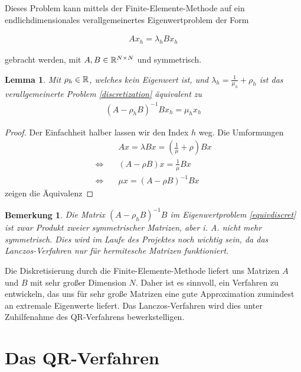 \documentclass{article}
\theoremstyle{plain}
\newtheorem{lemma}      [theorem]{Lemma}
\newtheorem{remark}     [theorem]{Bemerkung}
\begin{document}
Dieses Problem kann mittels der Finite-Elemente-Methode auf ein endlichdimensionales verallgemeinertes Eigenwertproblem der Form

\begin{align} \label{discretization}
	A x_h = \lambda_h B x_h
\end{align}

gebracht werden, mit $A, B \in \mathbb{R}^{N \times N}$ und symmetrisch.

\begin{lemma}\label{lemma_1_3}
	Mit $\rho_h \in \mathbb{R}$, welches kein Eigenwert ist, und $\lambda_h = \frac{1}{\mu_h} + \rho_h$ ist das verallgemeinerte Problem \eqref{discretization} äquivalent  zu
	\begin{align} \label{equivdiscret}
		(A - \rho_h B)^{-1} B x_h = \mu_h x_h
	\end{align}
\end{lemma}

\begin{proof}
	Der Einfachheit halber lassen wir den Index $h$ weg. Die Umformungen
	\begin{align*}
		&A x = \lambda B x = (\frac{1}{\mu} + \rho) B x \\
		\Leftrightarrow \quad &(A - \rho B)x = \frac{1}{\mu} B x \\
		\Leftrightarrow \quad &\mu x = (A - \rho B)^{-1}B x
	\end{align*}
	zeigen die Äquivalenz
\end{proof}

\begin{remark}\label{remark_1_4}
	Die Matrix $(A - \rho_h B)^{-1} B$ im Eigenwertproblem \eqref{equivdiscret} ist zwar Produkt zweier symmetrischer Matrizen, aber i. A. nicht mehr symmetrisch. Dies wird im Laufe des Projektes noch wichtig sein, da das Lanczos-Verfahren nur für hermitesche Matrizen funktioniert.
\end{remark}

Die Diskretisierung durch die Finite-Elemente-Methode liefert uns Matrizen $A$ und $B$ mit sehr großer Dimension $N$. Daher ist es sinnvoll, ein Verfahren zu entwickeln, das uns für sehr große Matrizen eine gute Approximation zumindest an extremale Eigenwerte liefert. Das Lanczos-Verfahren wird dies unter Zuhilfenahme des QR-Verfahrens bewerkstelligen.

\section{Das QR-Verfahren}\label{section_QR}
\end{document}
